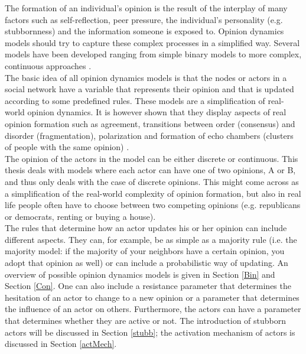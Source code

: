 \documentclass[11 pt , letterpaper , twoside , openright]{book}
\begin{document}
The formation of an individual's opinion is the result of the interplay of many factors such as self-reflection, peer pressure, the individual's personality (e.g. stubbornness) and the information someone is exposed to. Opinion dynamics models should try to capture these complex processes in a simplified way. Several models have been developed ranging from simple binary models to more complex, continuous approaches \cite{Sirbu2016}.\\
\newline
The basic idea of all opinion dynamics models is that the nodes or actors in a social network have a variable that represents their opinion and that is updated according to some predefined rules. These models are a simplification of real-world opinion dynamics. It is however shown that they display aspects of real opinion formation such as agreement, transitions between order (consensus) and disorder (fragmentation), polarization and formation of echo chambers (clusters of people with the same opinion) \cite{Sirbu2016}. \\
\newline
The opinion of the actors in the model can be either discrete or continuous. This thesis deals with models where each actor can have one of two opinions, A or B, and thus only deals with the case of discrete opinions. This might come across as a simplification of the real-world complexity of opinion formation, but also in real life people often have to choose between two competing opinions (e.g. republicans or democrats, renting or buying a house). \\
\newline
The rules that determine how an actor updates his or her opinion can include different aspects. They can, for example, be as simple as a majority rule (i.e. the majority model: if the majority of your neighbors have a certain opinion, you adopt that opinion as well) or can include a probabilistic way of updating. An overview of possible opinion dynamics models is given in Section \ref{Bin} and Section \ref{Con}. One can also include a resistance parameter that determines the hesitation of an actor to change to a new opinion or a parameter that determines the influence of an actor on others. Furthermore, the actors can have a parameter that determines whether they are active or not. The introduction of stubborn actors will be discussed in Section \ref{stubb}; the activation mechanism of actors is discussed in Section \ref{actMech}.\\
\newline
\end{document}
